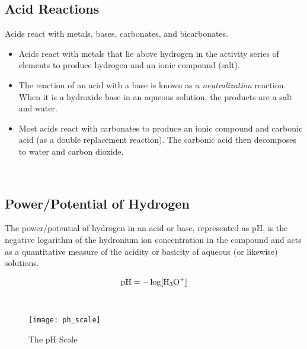 \subsection{Acid Reactions}

Acids react with metals, bases, carbonates, and bicarbonates. \\

\begin{itemize}
\item Acids react with metals that lie above hydrogen in the activity series of elements to produce hydrogen and an ionic compound (salt).
\item The reaction of an acid with a base is known as a \textit{neutralization} reaction. When it is a hydroxide base in an aqueous solution, the products are a salt and water.
\item Most acids react with carbonates to produce an ionic compound and carbonic acid (as a double replacement reaction). The carbonic acid then decomposes to water and carbon dioxide.
\end{itemize}

\noindent
{} \\

\subsection{Power/Potential of Hydrogen}

\begin{defn}
The power/potential of hydrogen in an acid or base, represented as pH, is the negative logarithm of the hydronium ion concentration in the compound and acts as a quantitative measure of the acidity or basicity of aqueous (or likewise) solutions.

\begin{equation}
\mathrm{pH} = -\log[\ce{H3O+}]
\end{equation}
\end{defn}

\noindent
{} \\

\begin{figure}[H]
	\centering
	\texttt{[image: ph\_scale]}
	\caption{The pH Scale}
\end{figure}

